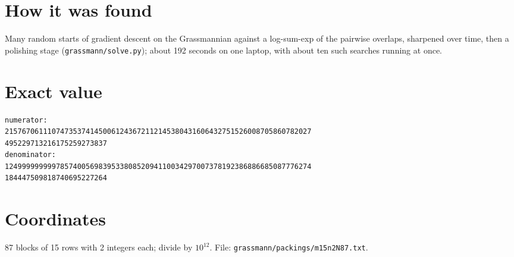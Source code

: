 \documentclass[11pt,a4paper]{article}
\begin{document}
\section{How it was found}
Many random starts of gradient descent on the Grassmannian against a log-sum-exp of the pairwise overlaps, sharpened over time, then a polishing stage (\texttt{grassmann/solve.py}); about 192 seconds on one laptop, with about ten such searches running at once.


\appendix
\section{Exact value}
{\small
\begin{verbatim}
numerator:
215767061110747353741450061243672112145380431606432751526008705860782027
495229713216175259273837
denominator:
124999999999785740056983953380852094110034297007378192386886685087776274
184447509818740695227264
\end{verbatim}}

\section{Coordinates}
87 blocks of 15 rows with 2 integers each; divide by $10^{12}$. File: \texttt{grassmann/packings/m15n2N87.txt}.
{\tiny
\begin{multicols}{4}
\end{multicols}}
\end{document}
